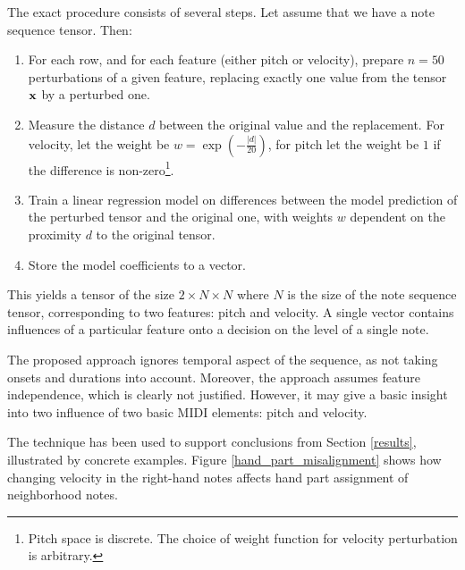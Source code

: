 The exact procedure consists of several steps. Let assume that we have a note sequence tensor. Then:\begin{enumerate}
	\item For each row, and for each feature (either pitch or velocity), prepare $n=50$ perturbations of a given feature, replacing exactly one value from the tensor ${\bf x}$ by a perturbed one.
	\item Measure the distance $d$ between the original value and the replacement. For velocity, let the weight be $w=\exp\left(-\tfrac{|d|}{20}\right)$, for pitch let the weight be $1$ if the difference is non-zero\footnote{Pitch space is discrete. The choice of weight function for velocity perturbation is arbitrary.}.
	\item Train a linear regression model on differences between the model prediction of the perturbed tensor and the original one, with weights $w$ dependent on the proximity $d$ to the original tensor.
	\item Store the model coefficients to a vector.
\end{enumerate}

This yields a tensor of the size $2 \times N \times N$ where $N$ is the size of the note sequence tensor, corresponding to two features: pitch and velocity. A single vector contains influences of a particular feature onto a decision on the level of a single note.

The proposed approach ignores temporal aspect of the sequence, as not taking onsets and durations into account. Moreover, the approach assumes feature independence, which is clearly not justified. However, it may give a basic insight into two influence of two basic MIDI elements: pitch and velocity.

The technique has been used to support conclusions from Section \ref{results}, illustrated by concrete examples. Figure \ref{hand_part_misalignment} shows how changing velocity in the right-hand notes affects hand part assignment of neighborhood notes. 

